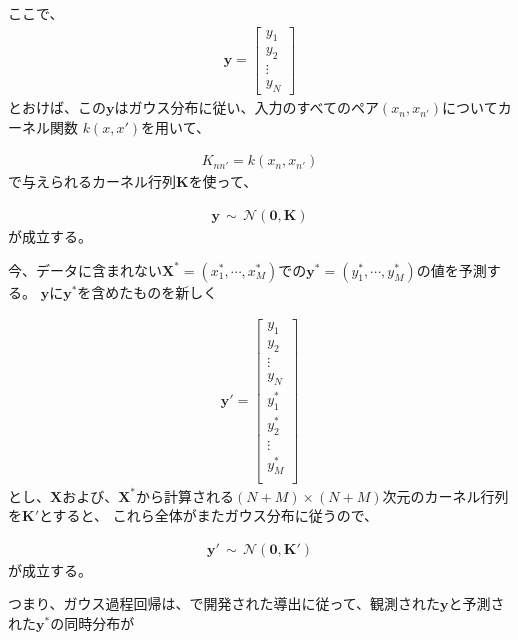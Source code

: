 \documentclass[titlepage]{jsreport}
\begin{document}
{{{ここで、
\large
\begin{eqnarray}
\bm{y}=  
    \left[
        \begin{array}{c}
        y_1\\
        y_2\\
        \vdots\\
        y_N
        \end{array}
    \right] \nonumber
\end{eqnarray}
\normalsize
とおけば、この$\bm{y}$はガウス分布に従い、入力のすべてのペア$(x_n,x_{n'})$についてカーネル関数
$k(x,x')$を用いて、

\large
\begin{eqnarray}
K_{nn'}
=   k(x_n,x_{n'})\nonumber
\end{eqnarray}
\normalsize
で与えられるカーネル行列$\bm{K}$を使って、

\large
\begin{eqnarray}
\bm{y}
\,{\sim}\,{\mathcal{N}}(\bm{0},\bm{K})  \nonumber
\end{eqnarray}
\normalsize
が成立する。

今、データに含まれない$\bm{X}^*=(x_1^*,\cdots,x_M^*)$での$\bm{y}^*=(y_1^*,\cdots,y_M^*)$の値を予測する。
$\bm{y}$に$\bm{y}^*$を含めたものを新しく

\large
\begin{eqnarray}
\bm{y'}=  
    \left[
        \begin{array}{c}
        y_1\\
        y_2\\
        \vdots\\
        y_N\\
        y_1^*\\
        y_2^*\\
        \vdots\\
        y_M^*\\
        \end{array}
    \right] \nonumber
\end{eqnarray}
\normalsize
とし、$\bm{X}$および、$\bm{X}^*$から計算される$(N+M)×(N+M)$次元のカーネル行列を$\bm{K'}$とすると、
これら全体がまたガウス分布に従うので、

\large
\begin{eqnarray}
\bm{y'}
\,{\sim}\,{\mathcal{N}}(\bm{0},\bm{K'})  \nonumber
\end{eqnarray}
\normalsize
が成立する。

つまり、ガウス過程回帰は、\cite{Gaussian-Processes-for-Machine-Learning}で開発された導出に従って、観測された$\bm{y}$と予測された$\bm{y}^*$の同時分布が

}}}
\end{document}
